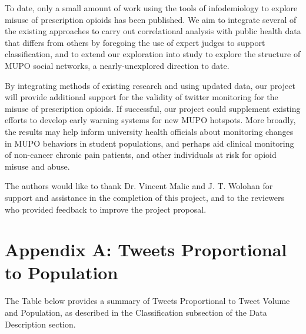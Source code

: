 \documentclass[sigconf]{acmart}
\begin{document}
To date, only a small amount of work using the tools of infodemiology to 
explore misuse of prescription opioids has been published. We aim to integrate 
several of the existing approaches to carry out correlational analysis with 
public health data that differs from others by foregoing the use of expert 
judges to support classification, and to extend our exploration into study to 
explore the structure of MUPO social networks, a nearly-unexplored direction 
to date. 

By integrating methods of existing research and using updated data, our project
will provide additional support for the validity of twitter monitoring for the
misuse of prescription opioids. If successful, our project could supplement 
existing efforts to develop early warning systems for new MUPO hotspots. More 
broadly, the results may help inform university health officials about
monitoring changes in MUPO behaviors in student populations, and perhaps aid 
clinical monitoring of non-cancer chronic pain patients, and other individuals 
at risk for opioid misuse and abuse. 
 

\begin{acks}
  The authors would like to thank Dr. Vincent Malic and J. T. Wolohan 
  for support and assistance in the completion of this project, and to the
  reviewers who provided feedback to improve the project proposal.
\end{acks}


 


\appendix

\section{Appendix A: Tweets Proportional to Population}
The Table below provides a summary of Tweets Proportional to Tweet 
Volume and Population, as described in the Classification subsection of 
the Data Description section.
\end{document}
